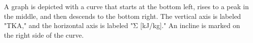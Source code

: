 A graph is depicted with a curve that starts at the bottom left, rises to a peak in the middle, and then descends to the bottom right. The vertical axis is labeled "TKA," and the horizontal axis is labeled "Σ [kJ/kg]." An incline is marked on the right side of the curve.